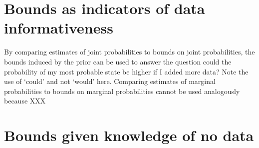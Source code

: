 \documentclass{article}
\begin{document}
\section*{Bounds as indicators of data informativeness}

By comparing estimates of joint probabilities to bounds on joint probabilities, the bounds induced by the prior can be used to answer the question could the probability of my most probable state be higher if I added more data? Note the use of `could' and not `would' here. Comparing estimates of marginal probabilities to bounds on marginal probabilities cannot be used analogously because XXX
  
\section*{Bounds given knowledge of no data}
\end{document}
